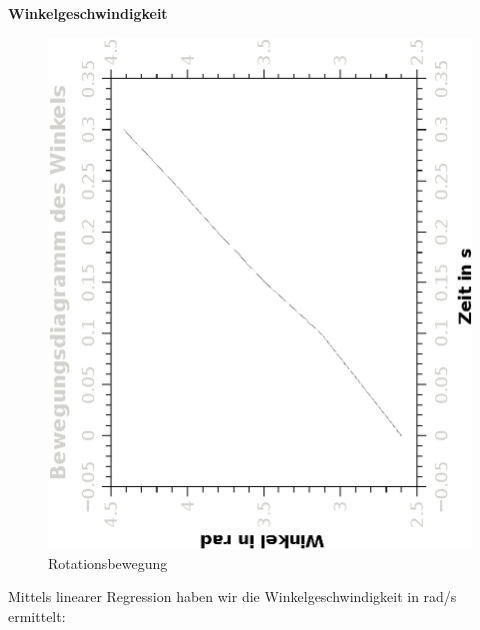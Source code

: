 \documentclass{article}
\begin{document}
\textbf{Winkelgeschwindigkeit}
\begin{figure}[H]
\caption{Rotationsbewegung}
\begin{center}
\includegraphics[scale=0.7,angle=-90]{winkel.eps}
\end{center}
\end{figure}
Mittels linearer Regression haben wir die Winkelgeschwindigkeit in rad/s ermittelt:
\end{document}
